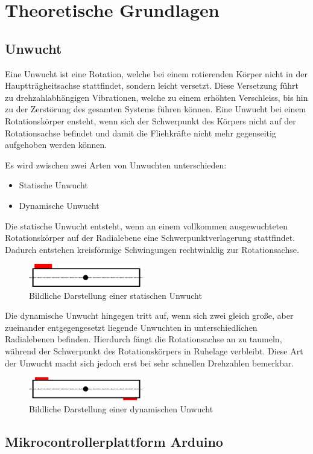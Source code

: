 
\chapter{Theoretische Grundlagen}

\section{Unwucht}
Eine Unwucht ist eine Rotation, welche bei einem rotierenden Körper nicht in der Hauptträgheitsachse stattfindet, sondern leicht versetzt.
Diese Versetzung führt zu drehzahlabhängigen Vibrationen, welche zu einem erhöhten Verschleiss, bis hin zu der Zerstörung des gesamten Systems führen können.
Eine Unwucht bei einem Rotationskörper ensteht, wenn sich der Schwerpunkt des Körpers nicht auf der Rotationsachse befindet und damit die Fliehkräfte nicht mehr gegenseitig aufgehoben werden können.

Es wird zwischen zwei Arten von Unwuchten unterschieden:
\begin{itemize}
	\item Statische Unwucht
	\item Dynamische Unwucht
\end{itemize}

Die statische Unwucht entsteht, wenn an einem vollkommen ausgewuchteten Rotationskörper auf der Radialebene eine Schwerpunktverlagerung stattfindet.
Dadurch entstehen kreisförmige Schwingungen rechtwinklig zur Rotationsachse.
\begin{figure}[H]
	\centering
	\includegraphics[width=5cm]{images/chapter/02/static_imbalance.png}
	\caption{Bildliche Darstellung einer statischen Unwucht}
\end{figure}
Die dynamische Unwucht hingegen tritt auf, wenn sich zwei gleich große, aber zueinander entgegengesetzt liegende Unwuchten in unterschiedlichen Radialebenen befinden.
Hierdurch fängt die Rotationsachse an zu taumeln, während der Schwerpunkt des Rotationskörpers in Ruhelage verbleibt.
Diese Art der Unwucht macht sich jedoch erst bei sehr schnellen Drehzahlen bemerkbar.
\begin{figure}[H]
	\centering
	\includegraphics[width=5cm]{images/chapter/02/dynamic_imbalance.png}
	\caption{Bildliche Darstellung einer dynamischen Unwucht}
\end{figure}

\section{Mikrocontrollerplattform Arduino}
